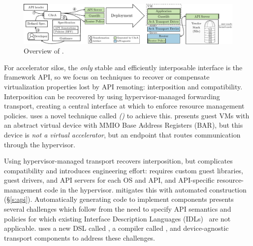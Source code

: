 \begin{figure}[!!thp!]
    \centering
    \includegraphics[width=\textwidth]{ava/images/overview.pdf}
    \caption{Overview of \AvA.}
    \label{fig:overview}
    \vspace*{-1em}
\end{figure}


For accelerator silos, the \emph{only} stable and
efficiently interposable interface is the framework API, so
we focus on techniques to recover or compensate virtualization properties lost by
API remoting: interposition and compatibility.
Interposition can be recovered by using hypervisor-managed forwarding transport,
creating a central interface at which to enforce resource management policies.
\AvA uses a novel technique called \emph{\hirafull (\hira)} to achieve this.
\hira presents guest VMs with an abstract virtual device with MMIO Base Address Registers (BAR), but this device is \emph{not a virtual accelerator}, but an endpoint that
routes communication through the hypervisor.

Using hypervisor-managed transport recovers interposition, but complicates compatibility and introduces engineering effort:
\hira requires custom guest libraries, guest drivers, and API servers for each OS and API, and API-specific resource-management code in the hypervisor.
\AvA mitigates this with automated construction (\S\ref{s:api}).
Automatically generating code to implement \hira components presents several challenges which
follow from the need to specify API semantics and policies for which
existing Interface Description Languages (IDLs)~\cite{Lamb1987,MSIDL} are not applicable.
\AvA uses a new DSL called \Lapis, a compiler called \CAvA, and device-agnostic transport components to address these challenges.


